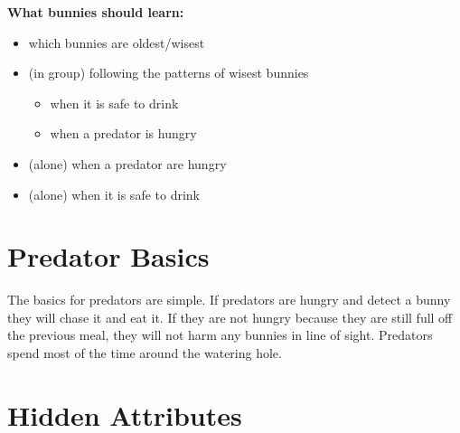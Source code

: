 \documentclass[twocolumn]{article}
\begin{document}
\noindent\textbf{What bunnies should learn:}
\begin{itemize}
    \item which bunnies are oldest/wisest
    \item (in group) following the patterns of wisest bunnies
        \begin{itemize}
            \item when it is safe to drink
            \item when a predator is hungry 
        \end{itemize}
    \item (alone) when a predator are hungry
    \item (alone) when it is safe to drink
\end{itemize}

\section{Predator Basics}

The basics for predators are simple. If predators are hungry and detect a bunny they will chase it and eat it. If they are not hungry because they are still full off the previous meal, they will not harm any bunnies in line of sight. Predators spend most of the time around the watering hole. 

\section{Hidden Attributes}


% 
% 
\end{document}
